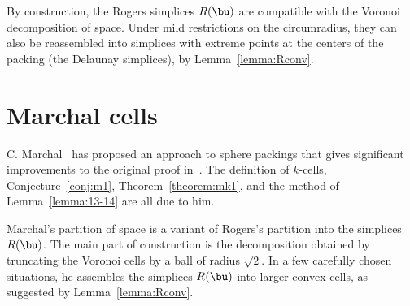 By construction, the Rogers simplices $R(\bu)$  are
compatible with the Voronoi decomposition of space.  Under mild
restrictions on the circumradius, they can also be reassembled into
simplices with extreme points at the centers of the packing (the Delaunay
simplices), by Lemma~\ref{lemma:Rconv}.
%
%



\section{Marchal cells}

C. Marchal~\cite{marchal:2008} has proposed an approach to sphere packings
 that gives significant improvements to the original proof
in~\cite{Hales:2006:DCG}.  The definition of $k$-cells,
Conjecture~\ref{conj:m1}, Theorem~\ref{theorem:mk1}, and the method of
Lemma~\ref{lemma:13-14} are all due to him.  
%


Marchal's partition of space is a variant of Rogers's partition into
the simplices $R(\bu)$.  The main part of construction is the
decomposition obtained by truncating the Voronoi cells by a ball of
radius $\sqrt2$.  In a few carefully chosen situations, he assembles
the simplices $R(\bu)$ into larger convex cells, as suggested by
Lemma~\ref{lemma:Rconv}.



